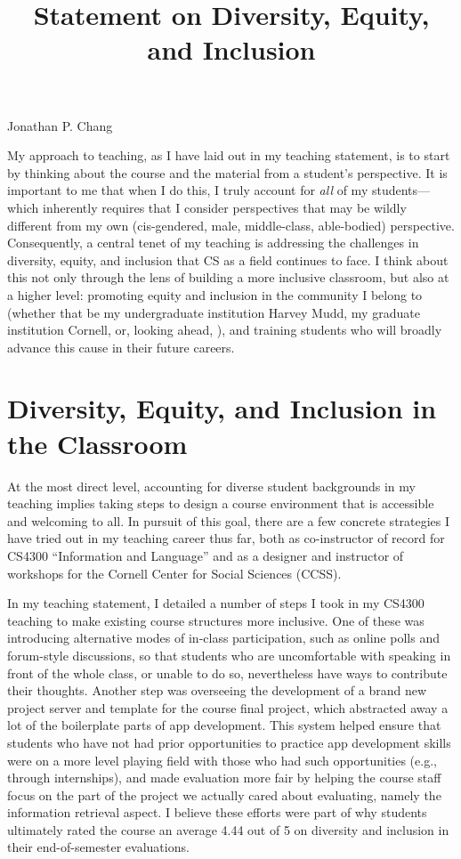 \documentclass[12pt,letterpaper]{article}
\title{Statement on Diversity, Equity, and Inclusion}
\begin{document}
\maketitle

{\centering Jonathan P. Chang \par}

\vspace{0.5\baselineskip}

My approach to teaching, as I have laid out in my teaching statement, is to start by thinking about the course and the material from a student's perspective.
It is important to me that when I do this, I truly account for \emph{all} of my students---which inherently requires that I consider perspectives that may be wildly different from my own (cis-gendered, male, middle-class, able-bodied) perspective.
Consequently, a central tenet of my teaching is addressing the challenges in diversity, equity, and inclusion that CS as a field continues to face.
I think about this not only through the lens of building a more inclusive classroom, but also at a higher level: promoting equity and inclusion in the community I belong to (whether that be my undergraduate institution Harvey Mudd, my graduate institution Cornell, or, looking ahead, \schoolname), and training students who will broadly advance this cause in their future careers.

\section{Diversity, Equity, and Inclusion in the Classroom}
At the most direct level, accounting for diverse student backgrounds in my teaching implies taking steps to design a course environment that is accessible and welcoming to all.
In pursuit of this goal, there are a few concrete strategies I have tried out in my teaching career thus far, both as co-instructor of record for CS4300 ``Information and Language'' and as a designer and instructor of workshops for the Cornell Center for Social Sciences (CCSS).

In my teaching statement, I detailed a number of steps I took in my CS4300 teaching to make existing course structures more inclusive.
One of these was introducing alternative modes of in-class participation, such as online polls and forum-style discussions, so that students who are uncomfortable with speaking in front of the whole class, or unable to do so, nevertheless have ways to contribute their thoughts.
Another step was overseeing the development of a brand new project server and template for the course final project, which abstracted away a lot of the boilerplate parts of app development.
This system helped ensure that students who have not had prior opportunities to practice app development skills were on a more level playing field with those who had such opportunities (e.g., through internships), and made evaluation more fair by helping the course staff focus on the part of the project we actually cared about evaluating, namely the information retrieval aspect.
I believe these efforts were part of why students ultimately rated the course an average 4.44 out of 5 on diversity and inclusion in their end-of-semester evaluations.
\end{document}
